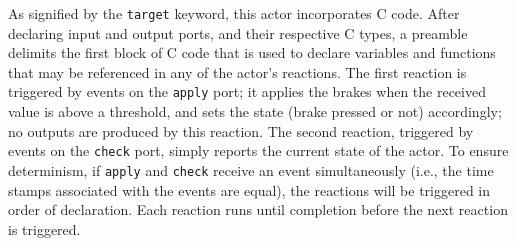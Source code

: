 \documentclass[sigconf]{acmart}
\newcommand{\todo}[1]{\mynote{TODO}{#1}{red}}
\newcommand{\marten}[1]{\mynote{Marten}{#1}{cyan}}%
\begin{document}
As signified by the {\tt target} keyword, this actor incorporates C code. After declaring input and output ports, and their respective C types, a preamble delimits the first block of C code that is used to declare variables and functions that may be referenced in any of the actor's reactions. The first reaction is triggered by events on the {\tt apply} port; it applies the brakes when the received value is above a threshold, and sets the state (brake pressed or not) accordingly; no outputs are produced by this reaction. The second reaction, triggered by events on the {\tt check} port, simply reports the current state of the actor. To ensure determinism, if {\tt apply} and {\tt check} receive an event simultaneously (i.e., the time stamps associated with the events are equal), the reactions will be triggered in order of declaration. Each reaction runs until completion before the next reaction is triggered.









   
\end{document}
